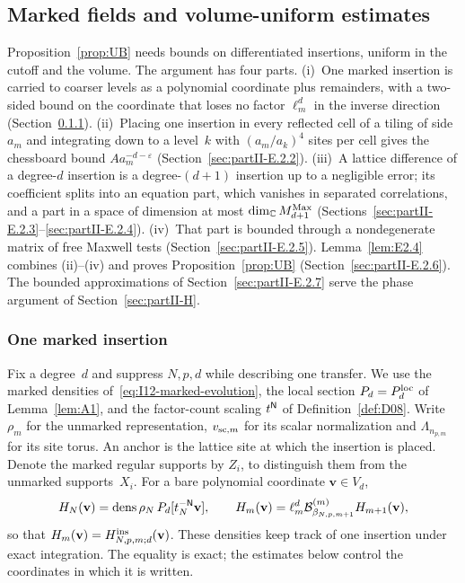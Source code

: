 \subsection{Marked fields and volume-uniform estimates}\label{sec:partII-E.2}

Proposition~\ref{prop:UB} needs bounds on differentiated insertions, uniform in the cutoff and the volume. The argument has four parts. (i)~One marked insertion is carried to coarser levels as a polynomial coordinate plus remainders, with a two-sided bound on the coordinate that loses no factor $\ell_m^d$ in the inverse direction (Section~\ref{sec:partII-E.2.1}). (ii)~Placing one insertion in every reflected cell of a tiling of side $a_m$ and integrating down to a level~$k$ with $(a_m/a_k)^4$ sites per cell gives the chessboard bound $Aa_m^{-d-\varepsilon}$ (Section~\ref{sec:partII-E.2.2}). (iii)~A lattice difference of a degree-$d$ insertion is a degree-$(d+1)$ insertion up to a negligible error; its coefficient splits into an equation part, which vanishes in separated correlations, and a part in a space of dimension at most $\dim_{\mathbb{C}}M_{d+1}^{\mathrm{Max}}$ (Sections~\ref{sec:partII-E.2.3}--\ref{sec:partII-E.2.4}). (iv)~That part is bounded through a nondegenerate matrix of free Maxwell tests (Section~\ref{sec:partII-E.2.5}). Lemma~\ref{lem:E2.4} combines (ii)--(iv) and proves Proposition~\ref{prop:UB} (Section~\ref{sec:partII-E.2.6}). The bounded approximations of Section~\ref{sec:partII-E.2.7} serve the phase argument of Section~\ref{sec:partII-H}.

\subsubsection{One marked insertion}\label{sec:partII-E.2.1}

Fix a degree~$d$ and suppress $N,p,d$ while describing one transfer. We use the marked densities of~\eqref{eq:I12-marked-evolution}, the local section $P_d=P_{d}^{\mathrm{loc}}$ of Lemma~\ref{lem:A1}, and the factor-count scaling $t^{\mathsf{N}}$ of Definition~\ref{def:D08}. Write $\rho_m$ for the unmarked representation, $v_{{\rm sc},m}$ for its scalar normalization and $\Lambda_{n_{p,m}}$ for its site torus. An anchor is the lattice site at which the insertion is placed. Denote the marked regular supports by $Z_i$, to distinguish them from the unmarked supports~$X_i$. For a bare polynomial coordinate $\mathbf v\in V_d$,
\begin{equation}\label{eq:E-marked-evolution}
 H_N(\mathbf v)=\operatorname{dens}\rho_N\,P_d[t_N^{-\mathsf{N}}\mathbf v],\qquad
 H_m(\mathbf v)=\ell_m^d\mathcal{B}^{(m)}_{\beta_{N,p,m+1}}H_{m+1}(\mathbf v),
\end{equation}
so that $H_m(\mathbf v)=H^{\rm ins}_{N,p,m;d}(\mathbf v)$. These densities keep track of one insertion under exact integration. The equality is exact; the estimates below control the coordinates in which it is written.

